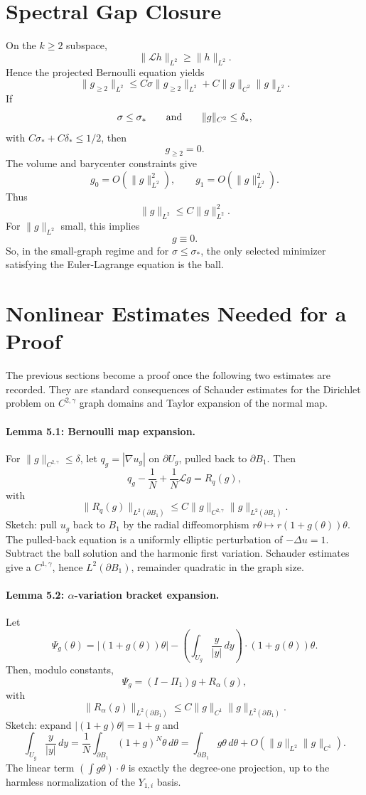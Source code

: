 \documentclass[11pt]{article}
\begin{document}
\section{Spectral Gap Closure}

On the \(k\ge2\) subspace,
\[
\|\mathcal L h\|_{L^2}\ge \|h\|_{L^2}.
\]
Hence the projected Bernoulli equation yields
\[
\|g_{\ge2}\|_{L^2}
\le
C\sigma\|g_{\ge2}\|_{L^2}
+C\|g\|_{C^2}\|g\|_{L^2}.
\]
If
\[
\sigma\le\sigma_*
\qquad\hbox{and}\qquad
\|g\|_{C^2}\le\delta_*,
\]
with \(C\sigma_*+C\delta_*\le1/2\), then
\[
g_{\ge2}=0.
\]
The volume and barycenter constraints give
\[
g_0=O(\|g\|_{L^2}^2),
\qquad
g_1=O(\|g\|_{L^2}^2).
\]
Thus
\[
\|g\|_{L^2}\le C\|g\|_{L^2}^2.
\]
For \(\|g\|_{L^2}\) small, this implies
\[
g\equiv0.
\]
So, in the small-graph regime and for \(\sigma\le\sigma_*\), the only selected
minimizer satisfying the Euler-Lagrange equation is the ball.

\section{Nonlinear Estimates Needed for a Proof}

The previous sections become a proof once the following two estimates are
recorded. They are standard consequences of Schauder estimates for the
Dirichlet problem on \(C^{2,\gamma}\) graph domains and Taylor expansion of the
normal map.

\paragraph{Lemma 5.1: Bernoulli map expansion.}
For \(\|g\|_{C^{2,\gamma}}\le\delta\), let \(q_g=|\nabla u_g|\) on
\(\partial U_g\), pulled back to \(\partial B_1\). Then
\[
q_g-\frac1N+\frac1N\mathcal L g=R_q(g),
\]
with
\[
\|R_q(g)\|_{L^2(\partial B_1)}
\le
C\|g\|_{C^{2,\gamma}}\|g\|_{L^2(\partial B_1)}.
\]
Sketch: pull \(u_g\) back to \(B_1\) by the radial diffeomorphism
\(r\theta\mapsto r(1+g(\theta))\theta\). The pulled-back equation is a uniformly
elliptic perturbation of \(-\Delta u=1\). Subtract the ball solution and the
harmonic first variation. Schauder estimates give a \(C^{1,\gamma}\), hence
\(L^2(\partial B_1)\), remainder quadratic in the graph size.

\paragraph{Lemma 5.2: \(\alpha\)-variation bracket expansion.}
Let
\[
\Psi_g(\theta)
=
|(1+g(\theta))\theta|
-
\left(\int_{U_g}\frac{y}{|y|}\,dy\right)\cdot(1+g(\theta))\theta .
\]
Then, modulo constants,
\[
\Psi_g=(I-\Pi_1)g+R_\alpha(g),
\]
with
\[
\|R_\alpha(g)\|_{L^2(\partial B_1)}
\le
C\|g\|_{C^1}\|g\|_{L^2(\partial B_1)}.
\]
Sketch: expand \(|(1+g)\theta|=1+g\) and
\[
\int_{U_g}\frac{y}{|y|}\,dy
=
\frac1N\int_{\partial B_1}(1+g)^N\theta\,d\theta
=
\int_{\partial B_1}g\theta\,d\theta+O(\|g\|_{L^2}\|g\|_{C^1}).
\]
The linear term \((\int g\theta)\cdot\theta\) is exactly the degree-one
projection, up to the harmless normalization of the \(Y_{1,i}\) basis.
\end{document}

